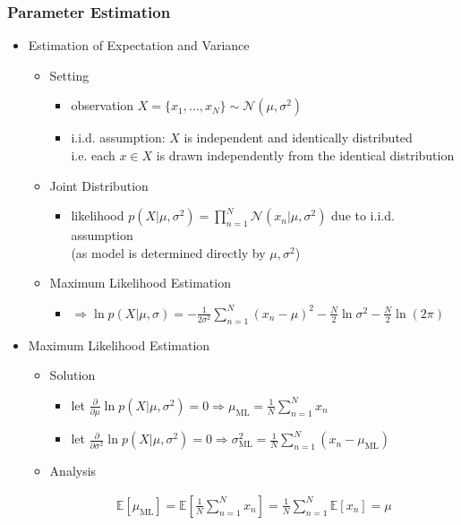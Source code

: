 \subsubsection{Parameter Estimation}
\begin{itemize}
\item Estimation of Expectation and Variance
	\begin{itemize}
	\item Setting
		\begin{itemize}
		\item observation $X=\{ x_1, ..., x_N \} \sim \mathcal N(\mu, \sigma^2)$
		\item i.i.d. assumption: $X$ is independent and identically distributed \\
		i.e. each $x\in X$ is drawn independently from the identical distribution
		\end{itemize}
	\item Joint Distribution
		\begin{itemize}
		\item likelihood $p(X|\mu, \sigma^2)=\prod_{n=1}^N\mathcal N(x_n|\mu, \sigma^2)$ due to i.i.d. assumption \\
		(as model is determined directly by $\mu, \sigma^2$)
		\end{itemize}
	\item Maximum Likelihood Estimation
		\begin{itemize}
		\item $\displaystyle \Rightarrow \ln p(X|\mu,\sigma) = -\frac 1{2\sigma^2} \sum_{n=1}^N(x_n-\mu)^2 -\frac N2 \ln \sigma^2 -\frac N2 \ln (2\pi)$
		\end{itemize}
	\end{itemize}
\item Maximum Likelihood Estimation
	\begin{itemize}
	\item Solution
		\begin{itemize}
		\item let $\displaystyle \frac {\partial}{\partial \mu} \ln p(X|\mu,\sigma^2) = 0 \Rightarrow \mu_{\text{ML}}=\frac 1N \sum_{n=1}^Nx_n $
		\item let $\displaystyle \frac {\partial}{\partial \sigma^2} \ln p(X|\mu,\sigma^2)=0 \Rightarrow \sigma_\text{ML}^2 = \frac 1N \sum_{n=1}^N (x_n- \mu_\text{ML})$
		\end{itemize}
	\item Analysis
		\begin{itemize}
		\Item \begin{align*} \displaystyle \mathbb E[\mu_\text{ML}] = \mathbb E[\frac 1N \sum_{n=1}^Nx_n] = \frac 1N \sum_{n=1}^N \mathbb E[x_n] = \mu \tag{as \(x_1,...,x_N\) i.i.d, drawn from \(\mathcal N(\mu,\sigma^2)\), thus \(\sim \mathcal N(\mu,\sigma^2)\)} \end{align*}

\end{itemize}
\end{itemize}
\end{itemize}
